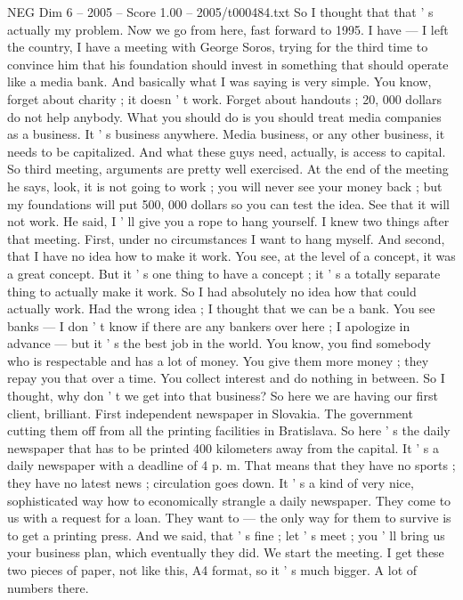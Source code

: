 \begin{textsample}{NEG Dim 6 – 2005 – Score 1.00 – 2005/t000484.txt}
So I thought that that ' s actually my problem.
Now we go from here, fast forward to 1995.
I have — I left the country, I have a meeting with George Soros, trying for the third time to convince him that his foundation should invest in something that should operate like a media bank.
And basically what I was saying is very simple.
You know, forget about charity ; it doesn ' t work.
Forget about handouts ; 20, 000 dollars do not help anybody.
What you should do is you should treat media companies as a business.
It ' s business anywhere.
Media business, or any other business, it needs to be capitalized.
And what these guys need, actually, is access to capital.
So third meeting, arguments are pretty well exercised.
At the end of the meeting he says, look, it is not going to work ; you will never see your money back ; but my foundations will put 500, 000 dollars so you can test the idea.
See that it will not work.
He said, I ' ll give you a rope to hang yourself.
I knew two things after that meeting.
First, under no circumstances I want to hang myself.
And second, that I have no idea how to make it work.
You see, at the level of a concept, it was a great concept.
But it ' s one thing to have a concept ; it ' s a totally separate thing to actually make it work.
So I had absolutely no idea how that could actually work.
Had the wrong idea ; I thought that we can be a bank.
You see banks — I don ' t know if there are any bankers over here ; I apologize in advance — but it ' s the best job in the world.
You know, you find somebody who is respectable and has a lot of money.
You give them more money ; they repay you that over a time.
You collect interest and do nothing in between.
So I thought, why don ' t we get into that business?
So here we are having our first client, brilliant.
First independent newspaper in Slovakia.
The government cutting them off from all the printing facilities in Bratislava.
So here ' s the daily newspaper that has to be printed 400 kilometers away from the capital.
It ' s a daily newspaper with a deadline of 4 p. m.
That means that they have no sports ; they have no latest news ; circulation goes down.
It ' s a kind of very nice, sophisticated way how to economically strangle a daily newspaper.
They come to us with a request for a loan.
They want to — the only way for them to survive is to get a printing press.
And we said, that ' s fine ; let ' s meet ; you ' ll bring us your business plan, which eventually they did.
We start the meeting.
I get these two pieces of paper, not like this, A4 format, so it ' s much bigger.
A lot of numbers there.

\end{textsample}
